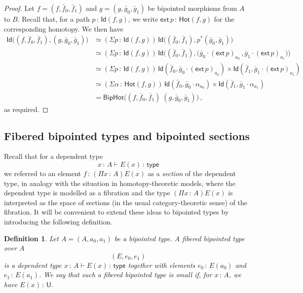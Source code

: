 \documentclass[10pt,a4paper,oneside,reqno]{amsart}
\numberwithin{equation}{section}
\theoremstyle{mythm}
\theoremstyle{mydef}
\newtheorem{definition}[theorem]{Definition}
\theoremstyle{myrmk}
\newcommand{\co}{\,{:}\,}
\newcommand{\type}{\mathsf{type}}
\newcommand{\ct}{\cdot}
\newcommand{\Hot}{\mathsf{Hot}}
\newcommand{\ext}{\mathsf{ext}}
\newcommand{\Id}{\mathsf{Id}}
\newcommand{\U}{\mathsf{U}}
\newcommand{\BipHot}{\mathsf{BipHot}}
\begin{document}
\begin{proof} Let  $f = (f, \bar{f}_0, \bar{f}_1)$ and $g = (g, \bar{g}_0, \bar{g}_1)$ be bipointed
morphisms from $A$ to $B$. Recall that, for a path $p \co \Id( f, g)$, we write $\ext \, p \co \Hot(f, g)$
for the corresponding homotopy. We then have
\begin{align*}
 \Id \big( (f,\bar{f}_0,\bar{f}_1) , (g,\bar{g}_0,\bar{g}_1)  \big)
  &  \simeq (\Sigma p \co \Id( f, g))  \, 
  \Id \big(  (\bar{f}_0,\bar{f}_1),  p^{\ast} (\bar{g}_0,\bar{g}_1) \big) \\
  & \simeq
(\Sigma  p \co \Id(f ,  g)) \, \Id\big( (\bar{f}_0,\bar{f}_1),  \big( \bar{g}_0 \ct  (\ext \, p)_{a_0} \, ,  
 \bar{g}_1 \ct (\ext \, p)_{a_1} \big) \big) \\
& \simeq (\Sigma p  \co \Id(f,g))  \, \Id(\bar{f}_0,  \bar{g}_0 \ct (\ext \, p)_{a_0} ) \times \Id( \bar{f}_1, 
 \bar{g}_1\ct (\ext \, p)_{a_1} ) \\
& \simeq (\Sigma \alpha \co \Hot(f, g)) \,  \Id(\bar{f}_0,  \bar{g}_0 \ct \alpha_{a_0} ) \times \Id(\bar{f}_1, \bar{g}_1
\ct \alpha_{a_1} ) \\
& = \BipHot \big( (f,\bar{f}_0,\bar{f}_1) \; (g,\bar{g}_0,\bar{g}_1) \big) \, , 
\end{align*} 
as required.
\end{proof}



\subsection{Fibered bipointed types and bipointed sections} Recall that for a dependent type
\[
 x \co A \vdash E(x) \co \type
\]
we referred to an element $f \co (\Pi x \co A) E(x)$ as a \emph{section} of the dependent type,
in analogy with the situation in homotopy-theoretic models, where the dependent type is modelled
as a fibration and the type $(\Pi x \co A)E(x)$ is interpreted as the space of sections (in the usual
category-theoretic sense) of the fibration. It will be convenient to extend these ideas to bipointed types 
 by introducing the following definition. 


\begin{definition} \label{def:fibbipointed}
Let $A = (A, a_0, a_1)$ be a bipointed type. A \emph{fibered bipointed type over $A$}
\[
(E, e_0, e_1)
\]  
is a dependent type $x \co A \vdash E(x) \co \type$ together with elements $e_0 \co E(a_0)$ and $e_1 \co E(a_1)$.
We say that  such a fibered bipointed type  is \emph{small} if, for
$x \co A$, we have $E(x) \co \U$.  
\end{definition}
\end{document}
